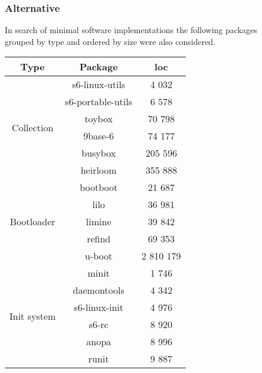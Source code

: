 \newpage

\subsubsection{Alternative}

In search of minimal software implementations the following packages\\ grouped by type and ordered by size were also considered.

\begin{table}[!ht]
    \centering
    \begin{tabular}{|c|c|c|}
        \hline
        Type & Package & \gls{loc} \\
        \hline
        \hline
        \multirow{6}{*}{Collection}
        & s6-linux-utils \cite{s6-linux} & 4 032 \\
        \cline{2-3}
        & s6-portable-utils \cite{s6-portable} & 6 578 \\
        \cline{2-3}
        & toybox \cite{toybox} & 70 798 \\
        \cline{2-3}
        & 9base-6 \cite{9base} & 74 177 \\
        \cline{2-3}
        & busybox \cite{busybox} & 205 596 \\
        \cline{2-3}
        & heirloom \cite{heirloom} \footnotemark[3] & 355 888 \\
        \hline
        \hline
        \multirow{5}{*}{Bootloader}
        & bootboot \cite{bootboot} & 21 687 \\
        \cline{2-3}
        & lilo \cite{lilo} & 36 981 \\
        \cline{2-3}
        & limine \cite{limine} & 39 842 \\
        \cline{2-3}
        & refind \cite{refind} & 69 353 \\
        \cline{2-3}
        & u-boot \cite{uboot} & 2 810 179 \\
        \hline
        \hline
        \multirow{11}{*}{Init system}
        & minit \cite{minit} & 1 746 \\
        \cline{2-3}
        & daemontools \cite{daemontools} & 4 342 \\
        \cline{2-3}
        & s6-linux-init \cite{s6-linux-init} & 4 976 \\
        \cline{2-3}
        & s6-rc \cite{s6-rc} & 8 920 \\
        \cline{2-3}
        & anopa \cite{anopa} & 8 996 \\
        \cline{2-3}
        & runit \cite{runit} & 9 887 \\

\end{tabular}
\end{table}
